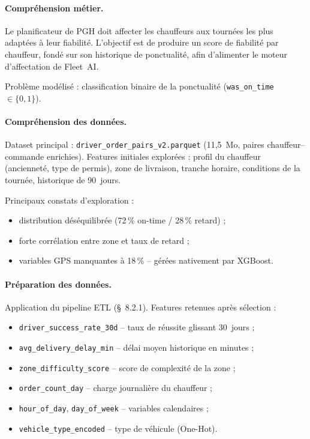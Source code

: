 \paragraph{Compréhension métier.}
Le planificateur de PGH doit affecter les chauffeurs aux tournées les plus adaptées à leur fiabilité. L'objectif est de produire un score de fiabilité par chauffeur, fondé sur son historique de ponctualité, afin d'alimenter le moteur d'affectation de Fleet~AI.

Problème modélisé : classification binaire de la ponctualité (\texttt{was\_on\_time} $\in \{0, 1\}$).

\paragraph{Compréhension des données.}
Dataset principal : \texttt{driver\_order\_pairs\_v2.parquet} (11,5~Mo, paires chauffeur--commande enrichies). Features initiales explorées : profil du chauffeur (ancienneté, type de permis), zone de livraison, tranche horaire, conditions de la tournée, historique de 90~jours.

Principaux constats d'exploration :
\begin{itemize}
  \item distribution déséquilibrée (72\,\% on-time / 28\,\% retard) ;
  \item forte corrélation entre zone et taux de retard ;
  \item variables GPS manquantes à 18\,\% -- gérées nativement par XGBoost.
\end{itemize}

\paragraph{Préparation des données.}
Application du pipeline ETL (\S~8.2.1). Features retenues après sélection :

\begin{itemize}
  \item \texttt{driver\_success\_rate\_30d} -- taux de réussite glissant 30~jours ;
  \item \texttt{avg\_delivery\_delay\_min} -- délai moyen historique en minutes ;
  \item \texttt{zone\_difficulty\_score} -- score de complexité de la zone ;
  \item \texttt{order\_count\_day} -- charge journalière du chauffeur ;
  \item \texttt{hour\_of\_day}, \texttt{day\_of\_week} -- variables calendaires ;
  \item \texttt{vehicle\_type\_encoded} -- type de véhicule (One-Hot).
\end{itemize}

